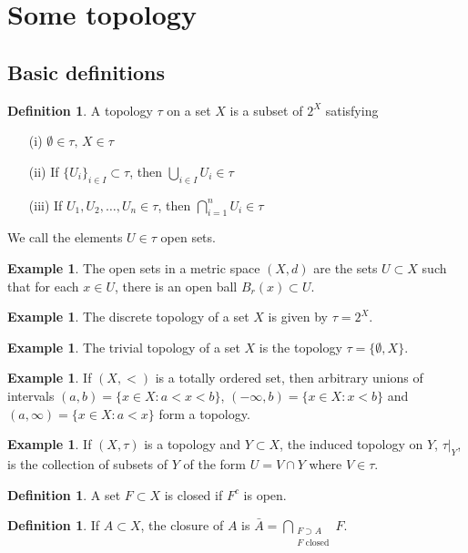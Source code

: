 \documentclass[11pt]{amsart}
\theoremstyle{definition}
\newtheorem{definition}[theorem]{Definition}
\newtheorem{example}[theorem]{Example}
\numberwithin{equation}{section}
\begin{document}
\section{Some topology}
\subsection{Basic definitions}
\begin{definition}
    A topology $\tau$ on a set $X$ is a subset of $2^X$ satisfying
    \begin{enumerate}
        \item [(i)] $\emptyset\in \tau, \,X\in\tau$
        \item [(ii)] If $\{U_i\}_{i\in I}\subset\tau$, then $\bigcup_{i\in I}U_i\in\tau$
        \item [(iii)] If $U_1,U_2,\ldots,U_n\in\tau$, then $\bigcap_{i=1}^nU_i\in\tau$
    \end{enumerate}
    We call the elements $U\in\tau$ open sets.
\end{definition}
\begin{example}
    The open sets in a metric space $(X,d)$ are the sets $U\subset X$ such that for each $x\in U$, there is an open ball $B_r(x)\subset U$.
\end{example}
\begin{example}
    The discrete topology of a set $X$ is given by $\tau=2^X$.
\end{example}
\begin{example}
    The trivial topology of a set $X$ is the topology $\tau=\{\emptyset,X\}$.
\end{example}
\begin{example}
    If $(X,<)$ is a totally ordered set, then arbitrary unions of intervals $(a,b)=\{x\in X:a<x<b\}$, $(-\infty,b)=\{x\in X:x<b\}$ and $(a,\infty)=\{x\in X:a<x\}$ form a topology.
\end{example}
\begin{example}
    If $(X,\tau)$ is a topology and $Y\subset X$, the induced topology on $Y$, $\tau|_Y$, is the collection of subsets of $Y$ of the form $U=V\cap Y$ where $V\in\tau$.
\end{example}
\begin{definition}
    A set $F\subset X$ is closed if $F^c$ is open.
\end{definition}
\begin{definition}
    If $A\subset X$, the closure of $A$ is $\bar A=\bigcap_{\substack{F\supset A\\F\text{ closed}}}F$. 
\end{definition}
\end{document}
